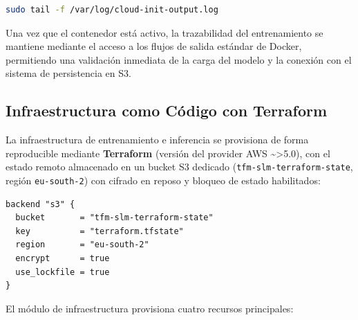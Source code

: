 \begin{lstlisting}[language=bash, caption={Comando para monitorizar el aprovisionamiento inicial.}]
sudo tail -f /var/log/cloud-init-output.log
\end{lstlisting}

Una vez que el contenedor está activo, la trazabilidad del entrenamiento se mantiene mediante el acceso a los flujos de salida estándar de Docker, permitiendo una validación inmediata de la carga del modelo y la conexión con el sistema de persistencia en S3.

\subsection{Infraestructura como Código con Terraform}

La infraestructura de entrenamiento e inferencia se provisiona de forma reproducible mediante \textbf{Terraform} (versión del provider AWS \textasciitilde{}>5.0), con el estado remoto almacenado en un bucket S3 dedicado (\texttt{tfm-slm-terraform-state}, región \texttt{eu-south-2}) con cifrado en reposo y bloqueo de estado habilitados:

\begin{lstlisting}[language=hcl, caption={Configuración del backend remoto de Terraform.}]
backend "s3" {
  bucket       = "tfm-slm-terraform-state"
  key          = "terraform.tfstate"
  region       = "eu-south-2"
  encrypt      = true
  use_lockfile = true
}
\end{lstlisting}

El módulo de infraestructura provisiona cuatro recursos principales:

